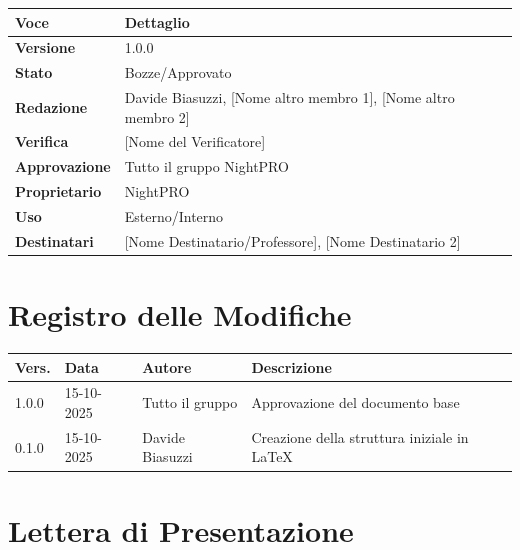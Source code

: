 \documentclass[12pt, a4paper]{article}
\begin{document}
\begin{longtable}{|p{2.5cm}|p{8cm}|}
    \hline
    \textbf{Voce} & \textbf{Dettaglio} \\
    \hline
    \endhead %
    
    \hline
    \textbf{Versione} & 1.0.0 \\
    \hline
    \textbf{Stato} & Bozze/Approvato \\
    \hline
    \textbf{Redazione} & Davide Biasuzzi, [Nome altro membro 1], [Nome altro membro 2] \\
    \hline
    \textbf{Verifica} & [Nome del Verificatore] \\
    \hline
    \textbf{Approvazione} & Tutto il gruppo NightPRO \\
    \hline
    \textbf{Proprietario} & NightPRO \\
    \hline
    \textbf{Uso} & Esterno/Interno \\
    \hline
    \textbf{Destinatari} & [Nome Destinatario/Professore], [Nome Destinatario 2] \\
    \hline
\end{longtable}

\newpage

\section*{Registro delle Modifiche}
\begin{longtable}{|p{1.5cm}|p{2cm}|p{3cm}|p{6cm}|}
    \hline
    \textbf{Vers.} & \textbf{Data} & \textbf{Autore} & \textbf{Descrizione} \\
    \hline
    \endhead
    
    \hline
    1.0.0 & 15-10-2025 & Tutto il gruppo & Approvazione del documento base \\
    \hline
    0.1.0 & 15-10-2025 & Davide Biasuzzi & Creazione della struttura iniziale in LaTeX \\
    \hline
\end{longtable}

\newpage

\section*{Lettera di Presentazione}
\end{document}
